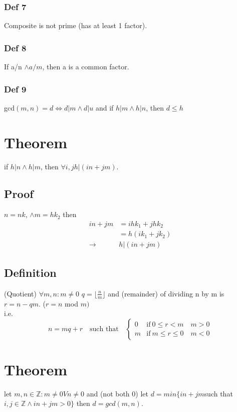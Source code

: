 \subsubsection{Def 7}
Composite is not prime (has at least 1 factor).
\subsubsection{Def 8}
If a/n $\land a/m$, then a is a common factor. 
\subsubsection{Def 9}
gcd$(m,n)=d \Leftrightarrow d|m \land d|u$ and if $h|m \land h|n$, then $d \leq h$

\section{Theorem}
if $h|n \land h|m$, then $\forall i,j  h|(in+jm)$. 

\subsection{Proof}
$n=nk$, $\land m=hk_2$ then 
\begin{align*}
in+jm &=ihk_1+jhk_2\\
&=h(ik_1+jk_2)\\
\rightarrow & h|(in+jm)
\end{align*}

\subsection{Definition}
(Quotient) $\forall m,n:m\ne0$ 
$q= \lfloor \frac{n}{m} \rfloor$ and (remainder) of dividing n by m is $r=n-qm$. ($r=n$ mod $m)$ \\
i.e. 
\[
\boxed{n = mq + r \quad \text{such that} \quad
\begin{cases}
0 & \text{if} \ 0 \leq r < m  \quad m > 0\\
m & \text{if} \ m \leq r \leq 0  \quad m < 0
\end{cases}
}
\]

\section{Theorem}
let $m,n \in \mathbb{Z}: m \ne 0 V n\ne0 $ and (not both 0) let $d=min\{in+jm$such that$i,j\in \mathbb{Z} \land in+jm >0\}$ then $d=gcd(m,n)$. 

